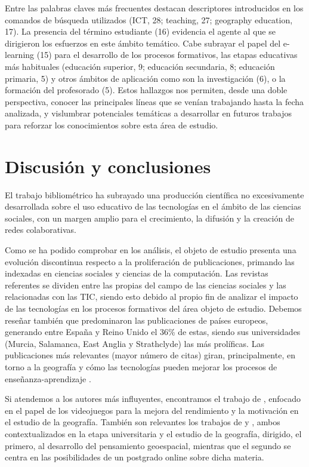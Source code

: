 \documentclass[spanish]{textolivre}
\begin{document}
Entre las palabras claves más frecuentes destacan descriptores introducidos en los comandos de búsqueda utilizados (ICT, 28; teaching, 27; geography education, 17). La presencia del término estudiante (16) evidencia el agente al que se dirigieron los esfuerzos en este ámbito temático. Cabe subrayar el papel del e-learning (15) para el desarrollo de los procesos formativos, las etapas educativas más habituales (educación superior, 9; educación secundaria, 8; educación primaria, 5) y otros ámbitos de aplicación como son la investigación (6), o la formación del profesorado (5). Estos hallazgos nos permiten, desde una doble perspectiva, conocer las principales líneas que se venían trabajando hasta la fecha analizada, y vislumbrar potenciales temáticas a desarrollar en futuros trabajos para reforzar los conocimientos sobre esta área de estudio.


\section{Discusión y conclusiones}
El trabajo bibliométrico ha subrayado una producción científica no excesivamente desarrollada sobre el uso educativo de las tecnologías en el ámbito de las ciencias sociales, con un margen amplio para el crecimiento, la difusión y la creación de redes colaborativas. 

Como se ha podido comprobar en los análisis, el objeto de estudio presenta una evolución discontinua respecto a la proliferación de publicaciones, primando las indexadas en ciencias sociales y ciencias de la computación. Las revistas referentes se dividen entre las propias del campo de las ciencias sociales y las relacionadas con las TIC, siendo esto debido al propio fin de analizar el impacto de las tecnologías en los procesos formativos del área objeto de estudio. Debemos reseñar también que predominaron las publicaciones de países europeos, generando entre España y Reino Unido el 36\% de estas, siendo sus universidades (Murcia, Salamanca, East Anglia y Strathclyde) las más prolíficas. Las publicaciones más relevantes (mayor número de citas) giran, principalmente, en torno a la geografía y cómo las tecnologías pueden mejorar los procesos de enseñanza-aprendizaje \cite{favier2014effects, lynch2008learning, mendler2002virtual, tuzun2009effects}. 

Si atendemos a los autores más influyentes, encontramos el trabajo de \textcite{tuzun2009effects}, enfocado en el papel de los videojuegos para la mejora del rendimiento y la motivación en el estudio de la geografía. También son relevantes los trabajos de \textcite{favier2014effects} y \textcite{mendler2002virtual}, ambos contextualizados en la etapa universitaria y el estudio de la geografía, dirigido, el primero, al desarrollo del pensamiento geoespacial, mientras que el segundo se centra en las posibilidades de un postgrado online sobre dicha materia.
\end{document}

